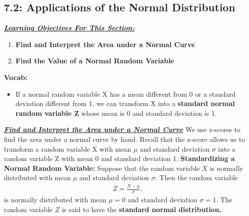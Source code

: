 \documentclass{report}
\begin{document}
    \pagebreak 
    \subsection*{7.2: Applications of the Normal Distribution}
    \bigbreak \noindent 
    \textbf{\textit{\underline{Learning Objectives For This Section:}}}
    \begin{enumerate}
        \item \textbf{Find and Interpret the Area under a Normal Curve}
        \item \textbf{Find the Value of a Normal Random Variable}
    \end{enumerate}
    \bigbreak \noindent 
    \textbf{Vocab:}
    \begin{itemize}
        \item If a normal random variable X has a mean different from 0 or a standard deviation different from 1, we can transform X into a \textbf{standard normal random variable Z} whose mean is 0 and standard deviation is 1. 
    \end{itemize}
    \bigbreak \noindent 

    \pagebreak \bigbreak \noindent 
    \textbf{\textit{\underline{Find and Interpret the Area under a Normal Curve}}}
    \bigbreak \noindent 
    We use z-scores to find the area under a normal curve by hand. Recall that the z-score allows us to transform a random variable X with mean $\mu$ and standard deviation $\sigma $ into a random variable Z with mean 0 and standard deviation 1.
    \bigbreak \noindent 
    \textbf{Standardizing a Normal Random Variable:}
    \bigbreak \noindent 
    Suppose that the random variable $X$ is normally distributed with mean $\mu$ and standard deviation $\sigma$.
    \bigbreak \noindent 
    Then the random variable 
    \begin{align*}
        Z = \frac{X - \mu}{\sigma}
    .\end{align*}
    is normally distributed with mean $\mu = 0$ and standard deviation $\sigma = 1$.
    \bigbreak \noindent 
    The random variable $Z$ is said to have the \textbf{standard normal distribution.}
\end{document}
